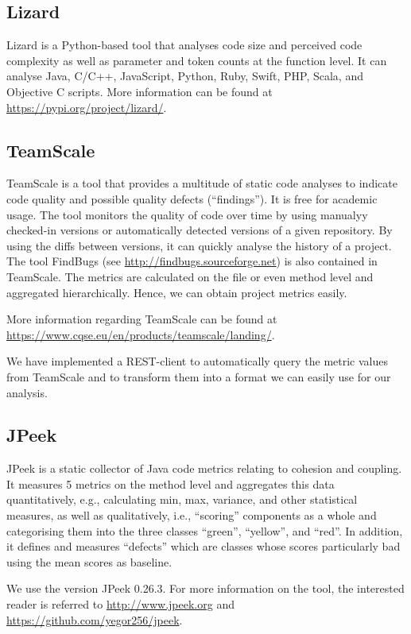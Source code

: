 \subsection{Lizard}
\label{sec:lizard}

Lizard is a Python-based tool that analyses code size and perceived code
complexity as well as parameter and token counts at the function level. It can
analyse Java, C/C++, JavaScript, Python, Ruby, Swift, PHP, Scala, and Objective
C scripts.  More information can be found at
\url{https://pypi.org/project/lizard/}.

\subsection{TeamScale}
\label{sec:teamscale}

TeamScale is a tool that provides a multitude of static code analyses to
indicate code quality and possible quality defects (\enquote{findings}). It is
free for academic usage. The tool monitors the quality of code over time by
using manualyy checked-in versions or automatically detected versions of a given
repository. By using the diffs between versions, it can quickly analyse the
history of a project. The tool FindBugs (see
\url{http://findbugs.sourceforge.net}) is also contained in TeamScale. The
metrics are calculated on the file or even method level and aggregated
hierarchically. Hence, we can obtain project metrics easily.

More information regarding TeamScale can be found at
\url{https://www.cqse.eu/en/products/teamscale/landing/}.

We have implemented a REST-client to automatically query the metric values from
TeamScale and to transform them into a format we can easily use for our
analysis.

\subsection{JPeek}
\label{sec:jpeek}

JPeek is a static collector of Java code metrics relating to cohesion and
coupling. It measures 5 metrics on the method level and aggregates this data
quantitatively, e.g., calculating min, max, variance, and other statistical
measures,  as well as qualitatively, i.e., \enquote{scoring} components as a
whole and categorising them into the three classes \enquote{green},
\enquote{yellow}, and \enquote{red}. In addition, it defines and measures
\enquote{defects} which are classes whose scores particularly bad using the mean
scores as baseline.  

We use the version JPeek 0.26.3. For more information on the tool, the
interested reader is referred to \url{http://www.jpeek.org} and
\url{https://github.com/yegor256/jpeek}.

